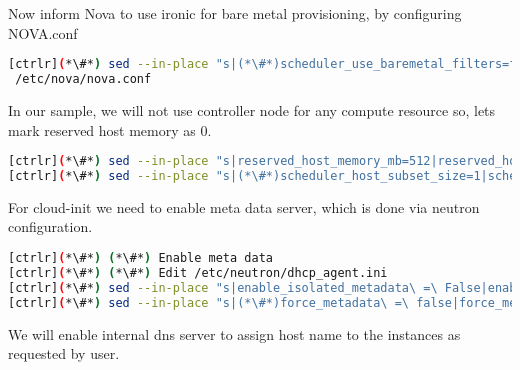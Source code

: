 Now inform Nova to use ironic for bare metal provisioning, by configuring NOVA.conf

\begin{lstlisting}[language=bash,keywords={}]
[ctrlr](*\#*) sed --in-place "s|(*\#*)scheduler_use_baremetal_filters=false|scheduler_use_baremetal_filters=true|" \
 /etc/nova/nova.conf
\end{lstlisting}

In our sample, we will not use controller node for any compute resource so, lets mark reserved host memory as 0.

\begin{lstlisting}[language=bash,keywords={}]
[ctrlr](*\#*) sed --in-place "s|reserved_host_memory_mb=512|reserved_host_memory_mb=0|" /etc/nova/nova.conf
[ctrlr](*\#*) sed --in-place "s|(*\#*)scheduler_host_subset_size=1|scheduler_host_subset_size=9999999|" /etc/nova/nova.conf
\end{lstlisting}

For cloud-init we need to enable meta data server, which is done via neutron configuration.

\begin{lstlisting}[language=bash,keywords={}]
[ctrlr](*\#*) (*\#*) Enable meta data
[ctrlr](*\#*) (*\#*) Edit /etc/neutron/dhcp_agent.ini
[ctrlr](*\#*) sed --in-place "s|enable_isolated_metadata\ =\ False|enable_isolated_metadata\ =\ True|" /etc/neutron/dhcp_agent.ini
[ctrlr](*\#*) sed --in-place "s|(*\#*)force_metadata\ =\ false|force_metadata\ =\ True|" \ /etc/neutron/dhcp_agent.ini
\end{lstlisting}

We will enable internal dns server to assign host name to the instances as requested by user. 


